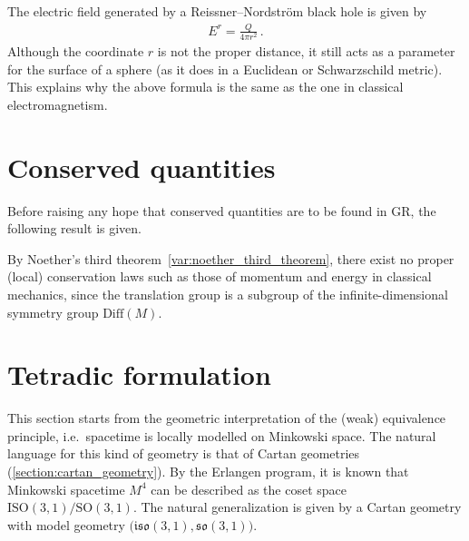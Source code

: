     \begin{remark}
        The electric field generated by a Reissner--Nordstr\"om black hole is given by
        \begin{gather}
            E^r = \frac{Q}{4\pi r^2}\,.
        \end{gather}
        Although the coordinate $r$ is not the proper distance, it still acts as a parameter for the surface of a sphere (as it does in a Euclidean or Schwarzschild metric). This explains why the above formula is the same as the one in classical electromagnetism.
    \end{remark}


\section{Conserved quantities}

    Before raising any hope that conserved quantities are to be found in GR, the following result is given.
    \begin{property}
        By Noether's third theorem~\ref{var:noether_third_theorem}, there exist no proper (local) conservation laws such as those of momentum and energy in classical mechanics, since the translation group is a subgroup of the infinite-dimensional symmetry group $\mathrm{Diff}(M)$.
    \end{property}


\section{Tetradic formulation}

    This section starts from the geometric interpretation of the (weak) equivalence principle, i.e.~spacetime is locally modelled on Minkowski space. The natural language for this kind of geometry is that of Cartan geometries (\cref{section:cartan_geometry}). By the Erlangen program, it is known that Minkowski spacetime $M^4$ can be described as the coset space $\mathrm{ISO}(3,1)/\mathrm{SO}(3,1)$. The natural generalization is given by a Cartan geometry with model geometry $\bigl(\mathfrak{iso}(3,1),\mathfrak{so}(3,1)\bigr)$.

